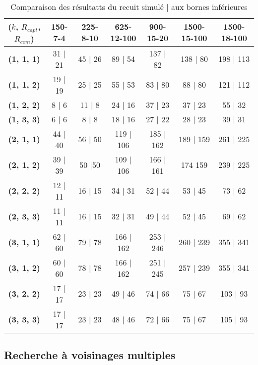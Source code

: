 \documentclass[12pt]{article}
\begin{document}
\begin{table}[]
  \caption{Comparaison des résultatts du recuit simulé | aux bornes inférieures}
  \centering
  \label{tab:my-table}
  \begin{tabular}{|c|c|c|c|c|c|c|}
  \hline
  ($k$, $R_{capt}$, $R_{com}$) & \textbf{150-7-4} & \textbf{225-8-10} & \textbf{625-12-100} & \textbf{900-15-20} & \textbf{1500-15-100} & \textbf{1500-18-100} \\ \hline
  \textbf{(1, 1, 1)} & 31 | 21            & 45 | 26             & 89 | 54               & 137 | 82             & 138 | 80               & 198 | 113              \\ \hline
  \textbf{(1, 1, 2)} & 19 | 19            & 25 | 25             & 55 | 53               & 83 | 80              & 88 | 80                & 121 | 112              \\ \hline
  \textbf{(1, 2, 2)} & 8 | 6              & 11 | 8              & 24 | 16               & 37 | 23              & 37 | 23                & 55 | 32                \\ \hline
  \textbf{(1, 3, 3)} & 6 | 6              & 8 | 8               & 18 | 16               & 27 | 22              & 28 | 23                & 39 | 31                \\ \hline
  \textbf{(2, 1, 1)} & 44 | 40            & 56 | 50             & 119 | 106             & 185 | 162            & 189 | 159              & 261 | 225              \\ \hline
  \textbf{(2, 1, 2)} & 39 | 39            & 50 |50              & 109 | 106             & 166 | 161            & 174 159                & 239 | 225              \\ \hline
  \textbf{(2, 2, 2)} & 12 | 11            & 16 | 15             & 34 | 31               & 52 | 44              & 53 | 45                & 73 | 62                \\ \hline
  \textbf{(2, 3, 3)} & 11 | 11            & 16 | 15             & 32 | 31               & 49 | 44              & 52 | 45                & 69 | 62                \\ \hline
  \textbf{(3, 1, 1)} & 62 | 60            & 79 | 78             & 166 | 162             & 253 | 246            & 260 | 239              & 355 | 341              \\ \hline
  \textbf{(3, 1, 2)} & 60 | 60            & 78 | 78             & 166 | 162             & 251 | 245            & 257 | 239              & 355 | 341              \\ \hline
  \textbf{(3, 2, 2)} & 17 | 17            & 23 | 23             & 49 | 46               & 74 | 66              & 75 | 67                & 103 | 93               \\ \hline
  \textbf{(3, 3, 3)} & 17 | 17            & 23 | 23             & 48 | 46               & 72 | 66              & 75 | 67                & 105 | 93               \\ \hline
  \end{tabular}
  \end{table}

\subsection{Recherche à voisinages multiples}
\end{document}
